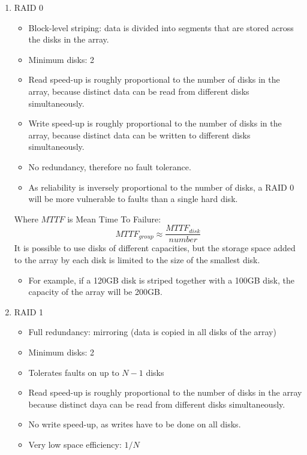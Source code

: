 \documentclass[11pt]{article}
\begin{document}
\begin{enumerate}
\item RAID 0
\label{sec:org3ed7138}
\begin{itemize}
\item Block-level striping: data is divided into segments that are stored across the disks in the array.
\item Minimum disks: 2
\item Read speed-up is roughly proportional to the number of disks in the array, because distinct data can be read from different disks simultaneously.
\item Write speed-up is roughly proportional to the number of disks in the array, because distinct data can be written to different disks simultaneously.
\item No redundancy, therefore no fault tolerance.
\item As reliability is inversely proportional to the number of disks, a RAID 0 will be more vulnerable to faults than a single hard disk.
\end{itemize}
Where \(MTTF\) is Mean Time To Failure:
\begin{equation}
MTTF_{group} \approx \frac{MTTF_{disk}}{number}
\end{equation}
It is possible to use disks of different capacities, but the storage space added to the array by each disk is limited to the size of the smallest disk.
\begin{itemize}
\item For example, if a 120GB disk is striped together with a 100GB disk, the capacity of the array will be 200GB.
\end{itemize}

\item RAID 1
\label{sec:org971bd5c}
\begin{itemize}
\item Full redundancy: mirroring (data is copied in all disks of the array)
\item Minimum disks: 2
\item Tolerates faults on up to \(N-1\) disks
\item Read speed-up is roughly proportional to the number of disks in the array because distinct daya can be read from different disks simultaneously.
\item No write speed-up, as writes have to be done on all disks.
\item Very low space efficiency: \(1/N\)
\end{itemize}


\end{enumerate}
\end{document}
